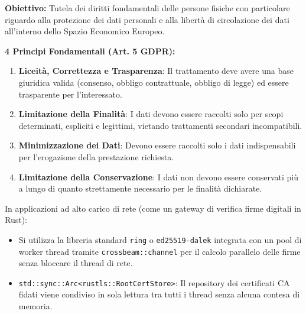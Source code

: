 \documentclass[11pt,a4paper]{article}
\begin{document}
\begin{solutionbox}
\textbf{Obiettivo:} Tutela dei diritti fondamentali delle persone fisiche con particolare riguardo alla protezione dei dati personali e alla libert\`a di circolazione dei dati all'interno dello Spazio Economico Europeo.

\textbf{4 Principi Fondamentali (Art. 5 GDPR):}
\begin{enumerate}
    \item \textbf{Liceit\`a, Correttezza e Trasparenza}: Il trattamento deve avere una base giuridica valida (consenso, obbligo contrattuale, obbligo di legge) ed essere trasparente per l'interessato.
    \item \textbf{Limitazione della Finalit\`a}: I dati devono essere raccolti solo per scopi determinati, espliciti e legittimi, vietando trattamenti secondari incompatibili.
    \item \textbf{Minimizzazione dei Dati}: Devono essere raccolti solo i dati indispensabili per l'erogazione della prestazione richiesta.
    \item \textbf{Limitazione della Conservazione}: I dati non devono essere conservati pi\`u a lungo di quanto strettamente necessario per le finalit\`a dichiarate.
\end{enumerate}
\end{solutionbox}

\begin{altbox}
In applicazioni ad alto carico di rete (come un gateway di verifica firme digitali in Rust):
\begin{itemize}
    \item Si utilizza la libreria standard \texttt{ring} o \texttt{ed25519-dalek} integrata con un pool di worker thread tramite \texttt{crossbeam::channel} per il calcolo parallelo delle firme senza bloccare il thread di rete.
    \item \texttt{std::sync::Arc<rustls::RootCertStore>}: Il repository dei certificati CA fidati viene condiviso in sola lettura tra tutti i thread senza alcuna contesa di memoria.
\end{itemize}
\end{altbox}
\end{document}
